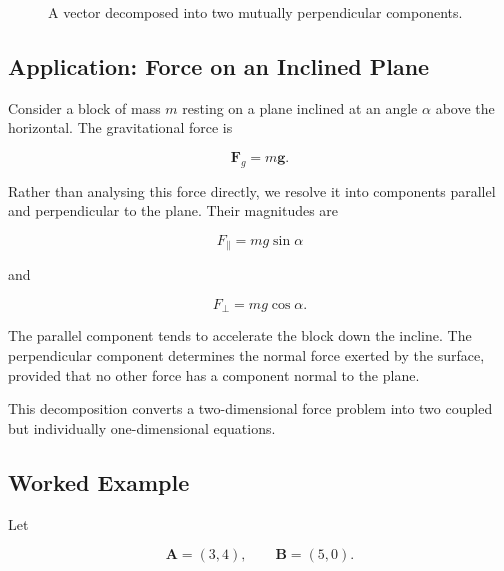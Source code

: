 \begin{figure}[htbp]
\centering
\begingroup

\endgroup
\caption{A vector decomposed into two mutually perpendicular components.}
\label{fig:orthogonal-decomposition}
\end{figure}

\subsection{Application: Force on an Inclined Plane}

Consider a block of mass $m$ resting on a plane inclined at an angle $\alpha$
above the horizontal. The gravitational force is

\[
\mathbf F_g=m\mathbf g.
\]

Rather than analysing this force directly, we resolve it into components parallel
and perpendicular to the plane. Their magnitudes are

\[
\boxed{F_{\parallel}=mg\sin\alpha}
\]

and

\[
\boxed{F_{\perp}=mg\cos\alpha.}
\]

The parallel component tends to accelerate the block down the incline. The
perpendicular component determines the normal force exerted by the surface,
provided that no other force has a component normal to the plane.

This decomposition converts a two-dimensional force problem into two coupled
but individually one-dimensional equations.

\subsection{Worked Example}

Let

\[
\mathbf A=(3,4),
\qquad
\mathbf B=(5,0).
\]

